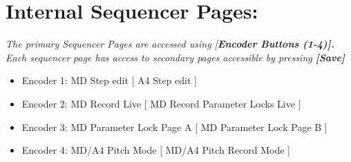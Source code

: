 \section{Internal Sequencer Pages:}
\textit{The primary Sequencer Pages are accessed using [\textbf{Encoder Buttons (1-4)].} Each sequencer page has access to secondary pages accessible by pressing \textbf{[Save]}}

\begin{itemize}
	\item Encoder 1: MD Step edit                          [ A4 Step edit ]
	\item Encoder 2: MD Record Live                      [ MD Record Parameter Locks Live ]
	\item Encoder 3: MD Parameter Lock Page A  [ MD Parameter Lock Page B ]
	\item Encoder 4: MD/A4 Pitch Mode                [ MD/A4 Pitch Record Mode ]
\end{itemize}